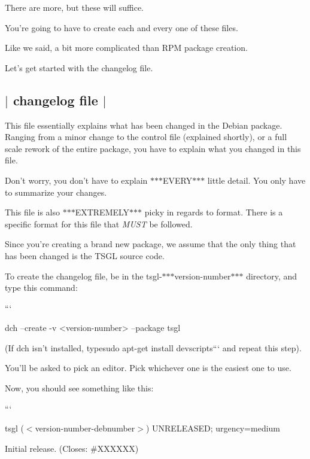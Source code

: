 There are more, but these will suffice.

You're going to have to create each and every one of these files.

Like we said, a bit more complicated than R\-P\-M package creation.

Let's get started with the {\ttfamily changelog} file. 

 \subsection*{$\vert$ changelog file $\vert$ }

This file essentially explains what has been changed in the Debian package. Ranging from a minor change to the control file (explained shortly), or a full scale rework of the entire package, you have to explain what you changed in this file.

Don't worry, you don't have to explain $\ast$$\ast$$\ast$\-E\-V\-E\-R\-Y$\ast$$\ast$$\ast$ little detail. You only have to summarize your changes.

This file is also $\ast$$\ast$$\ast$\-E\-X\-T\-R\-E\-M\-E\-L\-Y$\ast$$\ast$$\ast$ picky in regards to format. There is a specific format for this file that {\itshape M\-U\-S\-T} be followed.

Since you're creating a brand new package, we assume that the only thing that has been changed is the T\-S\-G\-L source code.

To create the {\ttfamily changelog} file, be in the tsgl-\/$\ast$$\ast$$\ast$version-\/number$\ast$$\ast$$\ast$ directory, and type this command\-:

``` \begin{DoxyVerb}dch --create -v <version-number> --package tsgl
\end{DoxyVerb}


{\ttfamily  (If dch isn't installed, type}sudo apt-\/get install devscripts``` and repeat this step).

You'll be asked to pick an editor. Pick whichever one is the easiest one to use.

Now, you should see something like this\-:

```

tsgl ($<$version-\/number-\/debnumber$>$) U\-N\-R\-E\-L\-E\-A\-S\-E\-D; urgency=medium


\begin{DoxyItemize}
\item Initial release. (Closes\-: \#\-X\-X\-X\-X\-X\-X)
\end{DoxyItemize}

